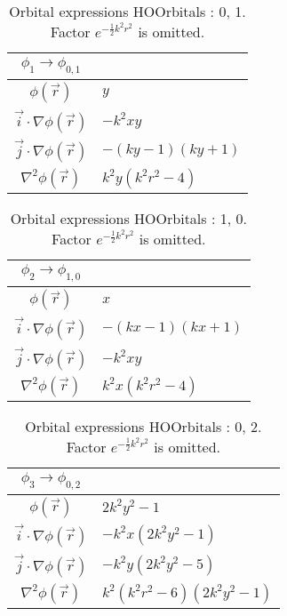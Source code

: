 \begin{table}
\begin{center}
\begin{tabular}{c|l}
$\phi_{1} \rightarrow \phi_{0, 1}$\\
\hline
$\phi(\vec r)$ & $y$\\
\hline
$\vec i\cdot \nabla \phi(\vec r)$ & $- k^{2} x y$\\
$\vec j\cdot \nabla \phi(\vec r)$ & $- \left(k y -1\right) \left(k y + 1\right)$\\
\hline
$\nabla^2 \phi(\vec r)$ & $k^{2} y \left(k^{2} r^{2} -4\right)$\\
\end{tabular}
\caption{Orbital expressions HOOrbitals : 0, 1. Factor $e^{- \frac{1}{2} k^{2} r^{2}}$ is omitted.}
\end{center}
\end{table}


\begin{table}
\begin{center}
\begin{tabular}{c|l}
$\phi_{2} \rightarrow \phi_{1, 0}$\\
\hline
$\phi(\vec r)$ & $x$\\
\hline
$\vec i\cdot \nabla \phi(\vec r)$ & $- \left(k x -1\right) \left(k x + 1\right)$\\
$\vec j\cdot \nabla \phi(\vec r)$ & $- k^{2} x y$\\
\hline
$\nabla^2 \phi(\vec r)$ & $k^{2} x \left(k^{2} r^{2} -4\right)$\\
\end{tabular}
\caption{Orbital expressions HOOrbitals : 1, 0. Factor $e^{- \frac{1}{2} k^{2} r^{2}}$ is omitted.}
\end{center}
\end{table}


\begin{table}
\begin{center}
\begin{tabular}{c|l}
$\phi_{3} \rightarrow \phi_{0, 2}$\\
\hline
$\phi(\vec r)$ & $2 k^{2} y^{2} -1$\\
\hline
$\vec i\cdot \nabla \phi(\vec r)$ & $- k^{2} x \left(2 k^{2} y^{2} -1\right)$\\
$\vec j\cdot \nabla \phi(\vec r)$ & $- k^{2} y \left(2 k^{2} y^{2} -5\right)$\\
\hline
$\nabla^2 \phi(\vec r)$ & $k^{2} \left(k^{2} r^{2} -6\right) \left(2 k^{2} y^{2} -1\right)$\\
\end{tabular}
\caption{Orbital expressions HOOrbitals : 0, 2. Factor $e^{- \frac{1}{2} k^{2} r^{2}}$ is omitted.}
\end{center}
\end{table}


